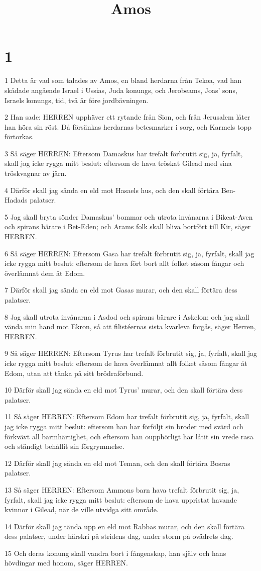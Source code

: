 

\title{Amos}


\chapter{1}

\par 1 Detta är vad som talades av Amos, en bland herdarna från Tekoa, vad han skådade angående Israel i Ussias, Juda konungs, och Jerobeams, Joas' sons, Israels konungs, tid, två år före jordbävningen.
\par 2 Han sade: HERREN upphäver ett rytande från Sion, och från Jerusalem låter han höra sin röst. Då försänkas herdarnas betesmarker i sorg, och Karmels topp förtorkas.
\par 3 Så säger HERREN: Eftersom Damaskus har trefalt förbrutit sig, ja, fyrfalt, skall jag icke rygga mitt beslut: eftersom de hava tröskat Gilead med sina tröskvagnar av järn.
\par 4 Därför skall jag sända en eld mot Hasaels hus, och den skall förtära Ben-Hadads palatser.
\par 5 Jag skall bryta sönder Damaskus' bommar och utrota invånarna i Bikeat-Aven och spirans bärare i Bet-Eden; och Arams folk skall bliva bortfört till Kir, säger HERREN.
\par 6 Så säger HERREN: Eftersom Gasa har trefalt förbrutit sig, ja, fyrfalt, skall jag icke rygga mitt beslut: eftersom de hava fört bort allt folket såsom fångar och överlämnat dem åt Edom.
\par 7 Därför skall jag sända en eld mot Gasas murar, och den skall förtära dess palatser.
\par 8 Jag skall utrota invånarna i Asdod och spirans bärare i Askelon; och jag skall vända min hand mot Ekron, så att filistéernas sista kvarleva förgås, säger Herren, HERREN.
\par 9 Så säger HERREN: Eftersom Tyrus har trefalt förbrutit sig, ja, fyrfalt, skall jag icke rygga mitt beslut: eftersom de hava överlämnat allt folket såsom fångar åt Edom, utan att tänka på sitt brödraförbund.
\par 10 Därför skall jag sända en eld mot Tyrus' murar, och den skall förtära dess palatser.
\par 11 Så säger HERREN: Eftersom Edom har trefalt förbrutit sig, ja, fyrfalt, skall jag icke rygga mitt beslut: eftersom han har förföljt sin broder med svärd och förkvävt all barmhärtighet, och eftersom han oupphörligt har låtit sin vrede rasa och ständigt behållit sin förgrymmelse.
\par 12 Därför skall jag sända en eld mot Teman, och den skall förtära Bosras palatser.
\par 13 Så säger HERREN: Eftersom Ammons barn hava trefalt förbrutit sig, ja, fyrfalt, skall jag icke rygga mitt beslut: eftersom de hava uppristat havande kvinnor i Gilead, när de ville utvidga sitt område.
\par 14 Därför skall jag tända upp en eld mot Rabbas murar, och den skall förtära dess palatser, under härskri på stridens dag, under storm på ovädrets dag.
\par 15 Och deras konung skall vandra bort i fångenskap, han själv och hans hövdingar med honom, säger HERREN.

